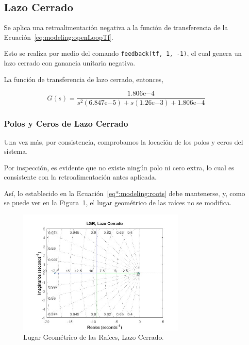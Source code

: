 \documentclass[12pt,a4paper]{article}
\newcommand{\expnum}[2]{{#1}\mathrm{e}{#2}}
\begin{document}
      \subsection{Lazo Cerrado}    
      
        Se aplica una retroalimentación negativa a la función de transferencia de la Ecuación~\ref{eq:modeling:openLoopTf}.

        Esto se realiza por medio del comando \verb|feedback(tf, 1, -1)|, el cual genera un lazo cerrado con ganancia 
        unitaria negativa. 

        La función de transferencia de lazo cerrado, entonces,

        \begin{equation}
          G\left(s\right) = \frac{\expnum{1.806}{-4}}{s^{2}\left(\expnum{6.847}{-5}\right) + s\left(\expnum{1.26}{-3}\right) + \expnum{1.806}{-4}}
          \label{eq:model:closedLoopTf}
        \end{equation}

      \subsubsection{Polos y Ceros de Lazo Cerrado}
        	
        Una vez más, por consistencia, comprobamos la locación de los polos y ceros del sistema.

        Por inspección, es evidente que no existe ningún polo ni cero extra, lo cual es consistente con la 
        retroalimentación antes aplicada. 

        Así, lo establecido en la Ecuación~\ref{eq*:modeling:roots} debe mantenerse, y, como se puede ver en la 
        Figura~\ref{fig:modeling:closedLoopLoci}, el lugar geométrico de las raíces no se modifica. 

        \begin{figure}
          \centering
          \includegraphics[width=0.75\textwidth, keepaspectratio]{./Resources/ClosedLoopLoci.jpg}
          \caption{Lugar Geométrico de las Raíces, Lazo Cerrado.}
          \label{fig:modeling:closedLoopLoci}
        \end{figure}
\end{document}

